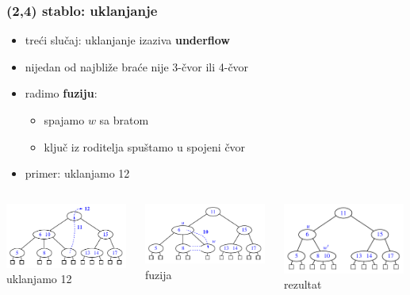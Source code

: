 \documentclass[compress,aspectratio=169]{beamer}
\begin{document}
\begin{frame}[fragile]
  \frametitle{(2,4) stablo: uklanjanje}
  \begin{itemize}
    \item treći slučaj: uklanjanje izaziva \textbf{underflow}
    \item nijedan od najbliže braće nije 3-čvor ili 4-čvor
    \item radimo \textbf{fuziju}:
    \begin{itemize}
      \item spajamo $w$ sa bratom
      \item ključ iz roditelja spuštamo u spojeni čvor 
    \end{itemize}
    \item primer: uklanjamo 12
  \end{itemize}
  \begin{columns}
    \begin{column}[c]{4cm}
      \begin{center}
        \includegraphics[width=4cm]{asp-11-pic36a.pdf}
      \\ uklanjamo 12
      \end{center}
    \end{column}
    \begin{column}[c]{4cm}
      \begin{center}
        \includegraphics[width=4cm]{asp-11-pic36b.pdf}
      \\ fuzija
      \end{center}
    \end{column}
    \begin{column}[c]{4cm}
      \begin{center}
        \includegraphics[width=4cm]{asp-11-pic36c.pdf}
      \\ rezultat
      \end{center}
    \end{column}
  \end{columns}
\end{frame}
\end{document}
